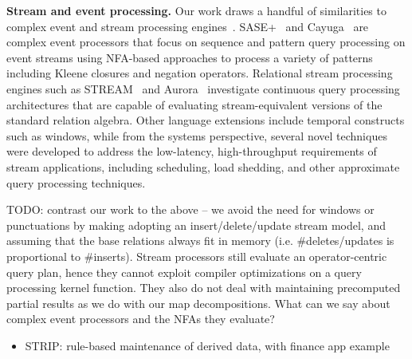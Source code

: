 \noindent \textbf{Stream and event processing.}
Our work draws a handful of similarities to complex event and stream processing
engines~\cite{wu-sigmod:06,agrawal-sigmod:08,white-pods:07,motwani-cidr:03,abadi-vldbj:03}.
SASE+~\cite{agrawal-sigmod:08} and Cayuga~\cite{white-pods:07} are complex
event processors that focus on sequence and pattern query processing on event
streams using NFA-based approaches to process a variety of patterns including
Kleene closures and negation operators.
Relational stream processing engines such as STREAM~\cite{motwani-cidr:03} and
Aurora~\cite{abadi-vldbj:03} investigate continuous query processing
architectures that are capable of evaluating stream-equivalent versions of
the standard relation algebra. Other language extensions include temporal
constructs such as windows, while from the systems perspective, several novel
techniques were developed to address the low-latency, high-throughput
requirements of stream applications, including scheduling, load shedding, and
other approximate query processing techniques.

TODO: contrast our work to the above -- we avoid the need for windows or
punctuations by making adopting an insert/delete/update stream model, and
assuming that the base relations always fit in memory (i.e. \#deletes/updates is
proportional to \#inserts). Stream processors still evaluate an operator-centric
query plan, hence they cannot exploit compiler optimizations on a query
processing kernel function. They also do not deal with maintaining precomputed
partial results as we do with our map decompositions. What can we say about
complex event processors and the NFAs they evaluate?


\begin{itemize}
  \item STRIP: rule-based maintenance of derived data, with finance app example \cite{adelberg-sigmod:97}
\end{itemize}

